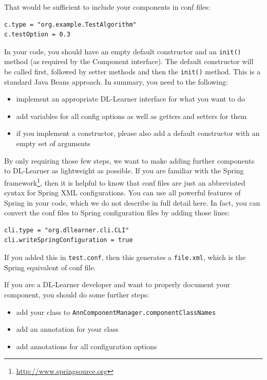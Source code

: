 \documentclass[a4paper,12pt]{scrartcl}
\begin{document}
That would be sufficient to include your components in conf files:
\begin{verbatim}
c.type = "org.example.TestAlgorithm"
c.testOption = 0.3
\end{verbatim}

In your code, you should have an empty default constructor and an \verb|init()| method (as required by the Component interface). The default constructor will be called first, followed by setter methods and then the \verb|init()| method. This is a standard Java Beans approach. In summary, you need to the following:
\begin{itemize}
	\item implement an appropriate DL-Learner interface for what you want to do
	\item add variables for all config options as well as getters and setters for them
	\item if you implement a constructor, please also add a default constructor with an empty set of arguments
\end{itemize}

By only requiring those few steps, we want to make adding further components to DL-Learner as lightweight as possible.
If you are familiar with the Spring framework\footnote{\url{http://www.springsource.org}}, then it is helpful to know that conf files are just an abbreviated syntax for Spring XML configurations. You can use all powerful features of Spring in your code, which we do not describe in full detail here. In fact, you can convert the conf files to Spring configuration files by adding those lines:

\begin{verbatim}
cli.type = "org.dllearner.cli.CLI"
cli.writeSpringConfiguration = true
\end{verbatim}

If you added this in \verb|test.conf|, then this generates a \verb|file.xml|, which is the Spring equivalent of conf file.

If you are a DL-Learner developer and want to properly document your component, you should do some further steps:
\begin{itemize}
	\item add your class to \verb|AnnComponentManager.componentClassNames|
	\item add an annotation for your class
	\item add annotations for all configuration options
\end{itemize}
\end{document}
